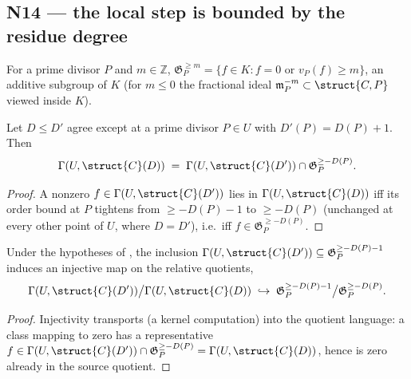 \subsection{N14 --- the local step is bounded by the residue degree}

\begin{definition}
  \label{def:adelic_orderGe}
  \leanok
  For a prime divisor \(P\) and \(m \in \mathbb{Z}\),
  \(\mathfrak G_P^{\ge m} = \{ f \in K : f = 0 \text{ or } v_P(f) \ge m
  \}\), an additive subgroup of \(K\) (for \(m \le 0\) the fractional
  ideal \(\mathfrak m_P^{-m} \subset \struct{C,P}\) viewed inside \(K\)).
\end{definition}

\begin{theorem}
  \label{thm:adelic_local_step_identity}
  \leanok
  Let \(D \le D'\) agree except at a prime divisor \(P \in U\) with
  \(D'(P) = D(P) + 1\). Then
  \[
    \Gamma(U, \struct{C}(D)) \;=\; \Gamma(U, \struct{C}(D')) \cap
      \mathfrak G_P^{\ge -D(P)}.
  \]
\end{theorem}
\begin{proof}
  \leanok
  A nonzero \(f \in \Gamma(U, \struct{C}(D'))\) lies in \(\Gamma(U,
  \struct{C}(D))\) iff its order bound at \(P\) tightens from \(\ge
  -D(P)-1\) to \(\ge -D(P)\) (unchanged at every other point of \(U\),
  where \(D = D'\)), i.e.\ iff \(f \in \mathfrak G_P^{\ge -D(P)}\).
\end{proof}

\begin{theorem}
  \label{thm:adelic_local_step_injective}
  \leanok
  Under the hypotheses of , the
  inclusion \(\Gamma(U, \struct{C}(D')) \subseteq \mathfrak G_P^{\ge
  -D(P)-1}\) induces an injective map on the relative quotients,
  \[
    \Gamma(U, \struct{C}(D')) \big/ \Gamma(U, \struct{C}(D))
      \;\hookrightarrow\;
      \mathfrak G_P^{\ge -D(P)-1} \big/ \mathfrak G_P^{\ge -D(P)}.
  \]
\end{theorem}
\begin{proof}
  \leanok
  Injectivity transports  (a
  kernel computation) into the quotient language: a class mapping to
  zero has a representative \(f \in \Gamma(U, \struct{C}(D')) \cap
  \mathfrak G_P^{\ge -D(P)} = \Gamma(U, \struct{C}(D))\), hence is zero
  already in the source quotient.
\end{proof}


